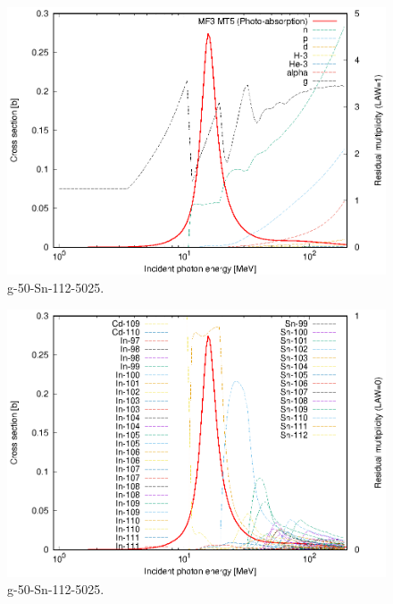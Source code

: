 \begin{figure}
 \includegraphics[width=\linewidth]{eps/g_50-Sn-112_5025.eps}
  \caption{g-50-Sn-112-5025.}
\end{figure}
\begin{figure}
 \includegraphics[width=\linewidth]{eps-law0/g_50-Sn-112_5025.eps}
 \caption{g-50-Sn-112-5025.}
\end{figure}
\newpage \clearpage

